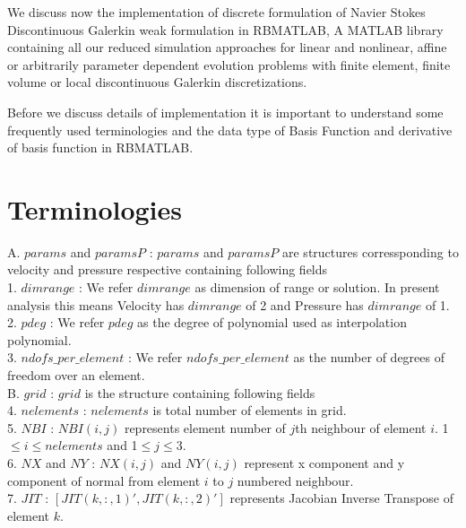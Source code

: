 \documentclass[a4paper,12pt]{book}
\begin{document}
We discuss now the implementation of discrete formulation of Navier Stokes Discontinuous Galerkin weak formulation in RBMATLAB, A MATLAB library containing all our reduced simulation approaches for linear and nonlinear, affine or arbitrarily parameter dependent evolution problems with finite element, finite volume or local discontinuous Galerkin discretizations. 

Before we discuss details of implementation it is important to understand some frequently used terminologies and the data type of Basis Function and derivative of basis function in RBMATLAB.

\section{Terminologies}


A. $params$ and $paramsP$ : $params$ and $paramsP$ are structures corressponding to velocity and pressure respective containing following fields\\

1. $dimrange$ : We refer $dimrange$ as dimension of range or solution. In present analysis this means Velocity has $dimrange$ of 2 and Pressure has $dimrange$ of 1.\\

2. $pdeg$ : We refer $pdeg$ as the degree of polynomial used as interpolation polynomial.\\

3. $ndofs\_per\_element$ : We refer $ndofs\_per\_element$ as the number of degrees of freedom over an element. \\

B. $grid$ : $grid$ is the structure containing following fields\\

4. $nelements$ : $nelements$ is total number of elements in grid.\\

5. $NBI$ : $NBI(i,j)$ represents element number of $j$th neighbour of element $i$. 1$\leq i \leq nelements$ and 1$\leq j \leq$3.\\

6. $NX$ and $NY$ : $NX(i,j)$ and $NY(i,j)$ represent x component and y component of normal from  element $i$ to $j$ numbered neighbour.\\

7. $JIT$ : $[JIT(k,:,1)',JIT(k,:,2)']$ represents Jacobian Inverse Transpose of element $k$.\\
\end{document}
